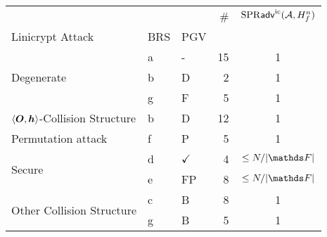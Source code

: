 \begin{tabular}{lllrc}
\toprule
 &  &  & \# & $\mathrm{SPR}\mathsf{adv}^{\mathrm{ic}}(\mathcal{A}, H^n_f)$ \\
Linicrypt Attack & BRS & PGV &  &  \\
\midrule
\multirow[c]{3}{*}{Degenerate} & a & - & 15 & 1 \\
\cline{2-5} \cline{3-5}
 & b & D & 2 & 1 \\
\cline{2-5} \cline{3-5}
 & g & F & 5 & 1 \\
\cline{1-5} \cline{2-5} \cline{3-5}
$\langle\boldsymbol{O}, \boldsymbol h\rangle$-Collision Structure & b & D & 12 & 1 \\
\cline{1-5} \cline{2-5} \cline{3-5}
Permutation attack & f & P & 5 & 1 \\
\cline{1-5} \cline{2-5} \cline{3-5}
\multirow[c]{2}{*}{Secure} & d & $\checkmark$ & 4 & $\leq N/|\F|$ \\
\cline{2-5} \cline{3-5}
 & e & FP & 8 & $\leq N/|\F|$ \\
\cline{1-5} \cline{2-5} \cline{3-5}
\multirow[c]{2}{*}{Other Collision Structure} & c & B & 8 & 1 \\
\cline{2-5} \cline{3-5}
 & g & B & 5 & 1 \\
\cline{1-5} \cline{2-5} \cline{3-5}
\bottomrule
\end{tabular}
